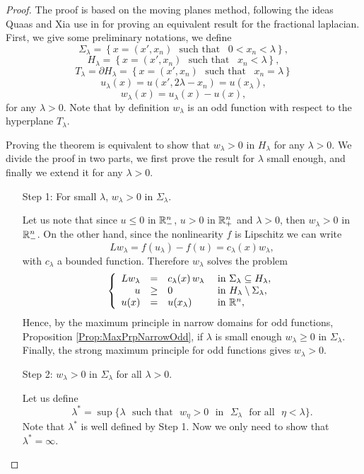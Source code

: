 \begin{proof}
The proof is based on the moving planes method, following the ideas Quaas and Xia use in \cite{QuaasXia} for proving an equivalent result for the fractional laplacian. First, we give some preliminary notations, we define
$$ \Sigma_\lambda = \left\{ x = (x',x_n) \,\,\text{ such that } \,\,\, 0<x_n<\lambda \right\}, $$
$$ H_\lambda = \left\{ x = (x',x_n) \,\,\text{ such that } \,\,\, x_n<\lambda \right\}, $$
$$ T_\lambda = \partial H_\lambda = \left\{ x = (x',x_n) \,\,\text{ such that } \,\,\, x_n=\lambda \right\} $$
$$ u_\lambda (x) = u(x',2\lambda-x_n) = u(x_\lambda), $$
$$ w_\lambda (x) = u_\lambda(x)-u(x), $$
for any $\lambda>0$. Note that by definition $w_\lambda$ is an odd function with respect to the hyperplane $T_\lambda$.

Proving the theorem is equivalent to show that $w_\lambda >0$ in $ H_\lambda $ for any $\lambda>0$. We divide the proof in two parts, we first prove the result for $\lambda$ small enough, and finally we extend it for any $\lambda>0$.
\begin{itemize}
\item[Step 1:] For small $\lambda$, $w_\lambda>0$ in $\Sigma_\lambda$.

Let us note that since $u\leq 0$ in $\mathbb{R}^n_-$, $u > 0$ in $\mathbb{R}^n_+$ and $\lambda>0$, then $w_\lambda >0$ in $\mathbb{R}^n_-$. On the other hand, since the nonlinearity $f$ is Lipschitz we can write
$$ Lw_\lambda = f(u_\lambda)-f(u) = c_\lambda(x) w_\lambda,  $$
with $c_\lambda$ a bounded function. Therefore $w_\lambda$ solves the problem
\begin{equation}
\left\{\begin{array}{rcll}
L w_\lambda &=& c_\lambda(x)\,w_\lambda  &\textrm{ in } \Sigma_\lambda\subseteq H_\lambda,\\
u &\geq& 0 &\textrm{ in } H_\lambda\setminus\Sigma_\lambda,\\
u(x) &=& u(x_\lambda) &\textrm{ in } \mathbb{R}^n,
\end{array} \right.
\end{equation}
Hence, by the maximum principle in narrow domains for odd functions, Proposition \ref{Prop:MaxPrpNarrowOdd}, if $\lambda$ is small enough $w_\lambda \geq 0$ in $\Sigma_\lambda$. Finally, the strong maximum principle for odd functions \todo{!!!!!!} gives $w_\lambda>0$.

\item[Step 2:] $w_\lambda>0$ in $\Sigma_\lambda$ for all $\lambda>0$.

Let us define
$$ \lambda^* = \sup\{\lambda \,\, \text{ such that } \,\, w_\eta>0 \,\, \text{ in } \,\, \Sigma_\lambda \,\, \text{ for all } \,\, \eta<\lambda\}. $$
Note that $\lambda^*$ is well defined by Step 1. Now we only need to show that $\lambda^*=\infty$. 


\end{itemize}
\end{proof}
